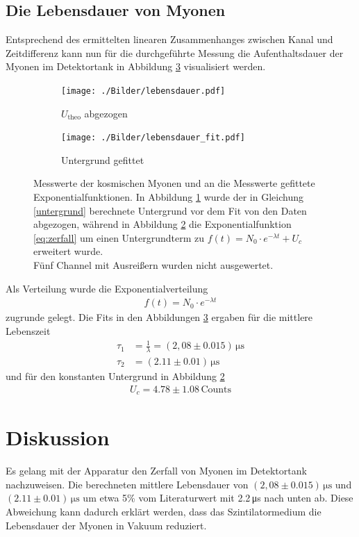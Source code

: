 \subsection{Die Lebensdauer von Myonen}
Entsprechend des ermittelten linearen Zusammenhanges zwischen Kanal und Zeitdifferenz kann nun für die durchgeführte Messung die Aufenthaltsdauer der Myonen im Detektortank in Abbildung \ref{fig:lebensdauer} visualisiert werden.

\begin{figure}[htbp]
	\begin{subfigure}[t]{0.45\textwidth}
		\texttt{[image: ./Bilder/lebensdauer.pdf]}
		\caption{$U_\text{theo}$ abgezogen}
		\label{fig:uTheo}
	\end{subfigure}
	\begin{subfigure}[t]{0.45\textwidth}
	\texttt{[image: ./Bilder/lebensdauer\_fit.pdf]}
	\caption{Untergrund gefittet}
	\label{fig:uNoTheo}
	\end{subfigure}
	\caption{Messwerte der kosmischen Myonen und an die Messwerte gefittete Exponentialfunktionen. In Abbildung \ref{fig:uTheo} wurde der in Gleichung \eqref{untergrund} berechnete Untergrund vor dem Fit von den Daten abgezogen, während in Abbildung \ref{fig:uNoTheo} die Exponentialfunktion \eqref{eq:zerfall} um einen Untergrundterm zu $f(t) = N_0\cdot e^{-\lambda t} + U_c$ erweitert wurde.\\
	Fünf Channel mit Ausreißern wurden nicht ausgewertet.}
	\label{fig:lebensdauer}
\end{figure}

Als Verteilung wurde die Exponentialverteilung 
\begin{align}
	f(t) = N_0\cdot e^{-\lambda t}
	\label{eq:zerfall}
\end{align}
zugrunde gelegt. Die Fits in den Abbildungen \ref{fig:lebensdauer} ergaben für die mittlere Lebenszeit
\begin{align}
	\tau_1 &= \frac{1}{\lambda} = (2,08 \pm 0.015)\,\si{\micro\second}\\
	\tau_2 &= (2.11 \pm 0.01)\,\si{\micro\second}
\end{align}
und für den konstanten Untergrund in Abbildung \ref{fig:uNoTheo}
\begin{align}
U_c = 4.78 \pm 1.08\,\text{Counts}
\end{align}

\section{Diskussion}
Es gelang mit der Apparatur den Zerfall von Myonen im Detektortank nachzuweisen. Die berechneten mittlere Lebensdauer von $(2,08 \pm 0.015)\,\si{\micro\second}$ und $(2.11 \pm 0.01)\,\si{\micro\second}$ um etwa 5\% vom Literaturwert\cite{PDG} mit 2.2\,\si{\micro\second} nach unten ab. Diese Abweichung kann dadurch erklärt werden, dass das Szintilatormedium die Lebensdauer der Myonen in Vakuum reduziert.

